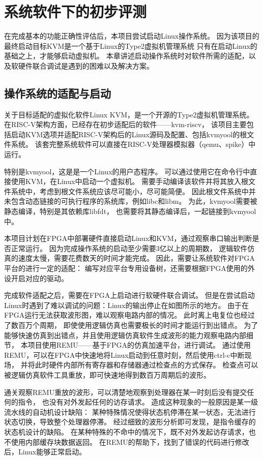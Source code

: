 \chapter{系统软件下的初步评测}

在完成基本的功能正确性评估后，本项目尝试启动Linux操作系统。
因为该项目的最终启动目标KVM是一个基于Linux的Type2虚拟机管理系统
只有在启动Linux的基础之上，才能够启动虚拟机。
本章讲述启动操作系统时对软件所需的适配，以及软硬件联合调试是遇到的困难以及解决方案。

\section{操作系统的适配与启动}
关于目标适配的虚拟化软件Linux KVM，是一个开源的Type2虚拟机管理系统。
在RISC-V架构方面，已经存在初步适配后的软件——kvm-riscv\cite{github:riscv-kvm}，
该项目主要包括启动KVM选项并适配RISC-V架构后的Linux源码及配置、包括kvmyool的根文件系统。
该套完整系统软件可以直接在RISC-V处理器模拟器（qemu、spike）中运行。

特别是kvmyool，这是是一个Linux的用户态程序。
可以通过使用它在命令行中直接使用KVM，在Linux中启动一个虚拟机。
需要手动编译该软件并将其放入根文件系统中，考虑到根文件系统应该尽可能小，尽可能简便。
因此根文件系统中并未包含动态链接的可执行程序的系统库，例如libc和libm。
为此，kvmyool需要被静态编译，特别是其依赖库libfdt，
也需要将其静态编译后，一起链接到kvmyool中。

本项目计划在FPGA中部署硬件直接启动Linux和KVM，通过观察串口输出判断是否正常运行。
因为完成操作系统的启动至少需要3亿以上的周期数，
逻辑软件仿真的速度太慢，需要花费数天的时间才能完成。
因此，需要让系统软件对FPGA平台的进行一定的适配：
编写对应平台专用设备树，还需要根据FPGA使用的外设开启对应的驱动。

完成软件适配之后，需要在FPGA上启动进行软硬件联合调试。
但是在尝试启动Linux时遇到了难以调试的问题：Linux的输出停止在如图所示的地方。
由于在FPGA运行无法获取波形图，难以观察电路内部的情况。
此时离上电复位也经过了数百万个周期，
即使使用逻辑仿真也需要极长的时间才能运行到出错点。
为了能够快速仿真到出错点，并且使用逻辑仿真软件生成波形的能力观察电路内部细节，
本项目使用REMU\cite{iccd2023remu}——基于FPGA的仿真加速平台，进行调试。
通过使用REMU，可以在FPGA中快速地将Linux启动到任意时刻，然后使用ctrl-c中断现场，
并将此时硬件内部所有寄存器和存储器通过检查点的方式保存。
检查点可以被逻辑仿真软件工具重放，即可快速地得到数百万周期后的波形。

通关观察REMU重放的波形，可以清楚地观察到处理器在某一时刻后没有提交任何的指令，
也没有对外发起任何的访存请求。
造成这种现象的一般原因是某一级流水线的自动机设计缺陷：
某种特殊情况使得状态机停滞在某一状态，无法进行状态切换，导致整个处理器停滞。
经过细致的波形分析即可发现，是指令缓存的状态机设计的缺陷。
在某种特殊的不命中的情况下，既不对外发起访存请求，也不使用内部缓存块数据返回。
在REMU的帮助下，找到了错误的代码进行修改后，Linux能够正常启动。

